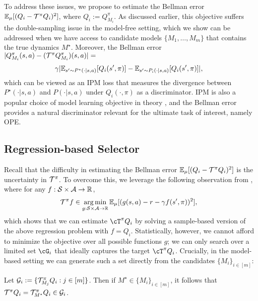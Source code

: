 To address these issues, we propose to estimate the Bellman error $\mathbb{E}_{\mu}[(Q_i - \mathcal{T}^\pi Q_i)^2]$, where $Q_i := Q_{M_i}^\pi$. As discussed earlier, this objective suffers the double-sampling issue in the model-free setting, which we show can be addressed when we have access to candidate models $\{M_1, \ldots, M_m\}$ that contains the true dynamics $M^\star$. Moreover, the Bellman error $|Q_{M_i}^\pi(s,a) - (\mathcal{T}^\pi Q_{M_i}^\pi)(s,a)| = $ 
$$
\gamma |\mathbb{E}_{s'\sim P^\star(\cdot|s,a)}[Q_i(s',\pi)] -  \mathbb{E}_{s'\sim P_i(\cdot|s,a)}[Q_i(s',\pi)]|,
$$
which can be viewed as an IPM loss \cite{muller1997integral} that measures the divergence between $P^\star(\cdot|s,a)$ and $P(\cdot|s,a)$ under $Q_i(\cdot, \pi)$ as a discriminator. IPM is also a popular choice of model learning objective in theory \cite{sun2019model, voloshin2021minimax}, and the Bellman error provides a natural discriminator relevant for the ultimate task of interest, namely OPE.


\subsection{Regression-based Selector}
Recall that the difficulty in estimating the Bellman error $\mathbb{E}_{\mu}[(Q_i - \mathcal{T}^\pi Q_i)^2]$ is the uncertainty in $\mathcal{T}^\pi$. 
%
To overcome this, we leverage the following observation from \cite{antos2008learning}, where for any $f: \mathcal{S}\times\mathcal{A}\to \mathbb{R}$, %
\begin{align} \label{eq:T-argmin}
\mathcal{T}^\pi f \in \operatorname*{arg\,min}_{g:\mathcal{S}\times\mathcal{A}\to\mathbb{R}} \mathbb{E}_{\mu}[(g(s,a) - r - \gamma f(s',\pi))^2],
\end{align}
%
%
%
which shows that we can estimate $\Tpi Q_i$ by solving a sample-based version of the above regression problem with $f=Q_i$. Statistically, however, we cannot afford to minimize the objective over all possible functions $g$; 
we can only search over a limited set $\cG_i$ that ideally captures the target $\Tpi Q_i$. Crucially, in the model-based setting 
we can generate such a set directly from the candidates $\{M_i\}_{i\in[m]}$:
%
\begin{proposition} \label{prop:gi}
Let $\mathcal{G}_i := \{ \mathcal{T}_{M_j}^\pi Q_i: j\in[m]\}$. Then if $M^\star \in \{M_i\}_{i\in[m]}$, it follows that $\mathcal{T}^\pi Q_i = \mathcal{T}_{M^\star}^\pi Q_i \in \mathcal{G}_i$.
\end{proposition}

